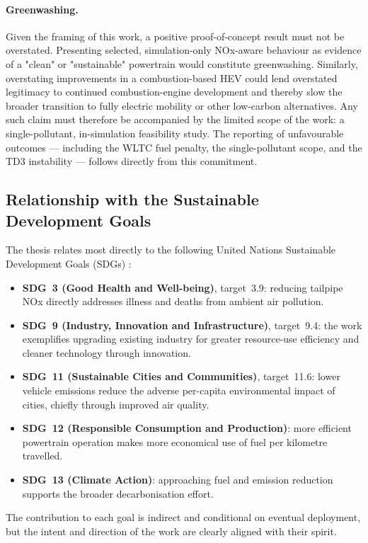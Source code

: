 \paragraph{Greenwashing.} Given the framing of this work, a positive proof-of-concept result must not be overstated. Presenting selected, simulation-only \ac{NOx}-aware behaviour as evidence of a "clean" or "sustainable" powertrain would constitute greenwashing. Similarly, overstating improvements in a combustion-based \ac{HEV} could lend overstated legitimacy to continued combustion-engine development and thereby slow the broader transition to fully electric mobility or other low-carbon alternatives. Any such claim must therefore be accompanied by the limited scope of the work: a single-pollutant, in-simulation feasibility study. The reporting of unfavourable outcomes --- including the \ac{WLTC} fuel penalty, the single-pollutant scope, and the \ac{TD3} instability --- follows directly from this commitment.

\subsection{Relationship with the Sustainable Development Goals}

The thesis relates most directly to the following United Nations Sustainable Development Goals (SDGs) \cite{united_nations_17_nodate}:

\begin{itemize}
  \item \textbf{SDG~3 (Good Health and Well-being)}, target~3.9: reducing tailpipe \ac{NOx} directly addresses illness and deaths from ambient air pollution.
  \item \textbf{SDG~9 (Industry, Innovation and Infrastructure)}, target~9.4: the work exemplifies upgrading existing industry for greater resource-use efficiency and cleaner technology through innovation.
  \item \textbf{SDG~11 (Sustainable Cities and Communities)}, target~11.6: lower vehicle emissions reduce the adverse per-capita environmental impact of cities, chiefly through improved air quality.
  \item \textbf{SDG~12 (Responsible Consumption and Production)}: more efficient powertrain operation makes more economical use of fuel per kilometre travelled.
  \item \textbf{SDG~13 (Climate Action)}: approaching fuel and emission reduction supports the broader decarbonisation effort.
\end{itemize}

The contribution to each goal is indirect and conditional on eventual deployment, but the intent and direction of the work are clearly aligned with their spirit.
